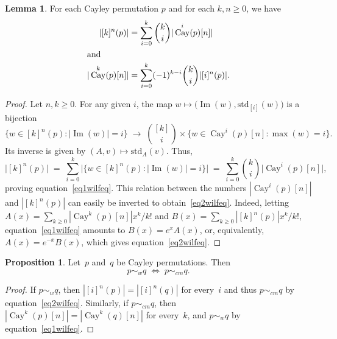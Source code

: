 \documentclass[a4paper, 11pt]{article}
\DeclareMathOperator{\Cay}{Cay}
\DeclareMathOperator{\Img}{Im}
\newcommand{\std}{\mathrm{std}}
\theoremstyle{definition}
\newtheorem{lemma}[theorem]{Lemma}
\newtheorem{proposition}[theorem]{Proposition}
\begin{document}
\begin{lemma}\label{lemma: eqforwilfequiv}
For each Cayley permutation $p$ and for each $k,n\ge 0$, we have
\begin{align}
|[k]^n(p)| &= \sum_{i=0}^k \binom{k}{i}|\Cay^i(p)[n]|\label{eq1wilfeq}\\
\shortintertext{and}
|\Cay^k(p)[n]| &= \sum_{i=0}^k(-1)^{k-i}\binom{k}{i}|[i]^n(p)|.\label{eq2wilfeq}
\end{align}
\end{lemma}
\begin{proof}
Let $n,k\ge 0$. For any given $i$, the map
$w\mapsto\bigl(\Img(w),\std_{[i]}(w)\bigr)$ is a bijection
\[
  \bigl\{ w\in [k]^n(p): |\Img(w)|=i \bigr\}
  \;\longrightarrow\;
  \binom{[k]}{i}\times \bigl\{w\in\Cay^i(p)[n]:\max(w)=i\bigr\}.
\]
Its inverse is given by $(A,v)\mapsto\std_A(v)$.
Thus,
\[
\bigl|[k]^n(p)\bigr|
\;=\; \sum_{i=0}^k \bigl|\bigl\{ w\in [k]^n(p): |\Img(w)|=i\bigr\}\bigr|
\;=\; \sum_{i=0}^k \binom{k}{i}\bigl|\Cay^i(p)[n]\bigr|,
\]
proving equation~\eqref{eq1wilfeq}. This relation between
the numbers $|\Cay^i(p)[n]|$ and $|[k]^n(p)|$ can easily be
inverted to obtain~\eqref{eq2wilfeq}. Indeed, letting
$A(x)=\sum_{k\ge 0}|\Cay^k(p)[n]|x^k/k!$ and
$B(x)=\sum_{k\ge 0}|[k]^n(p)|x^k/k!$, equation~\eqref{eq1wilfeq}
amounts to $B(x) = e^xA(x)$, or, equivalently, $A(x)=e^{-x}B(x)$, which gives
equation~\eqref{eq2wilfeq}.
\end{proof}

\begin{proposition}\label{prop: caywilfeq}
Let~$p$ and~$q$ be Cayley permutations. Then
$$
p\sim_w q\;\iff\;p\sim_{cm}q.
$$
\end{proposition}
\begin{proof}
If $p\sim_w q$, then $|[i]^n(p)|=|[i]^n(q)|$ for every~$i$
and thus $p\sim_{cm} q$ by equation~\eqref{eq2wilfeq}.
Similarly, if $p\sim_{cm} q$, then $|\Cay^k(p)[n]|=|\Cay^k(q)[n]|$
for every~$k$, and $p\sim_{w} q$ by equation~\eqref{eq1wilfeq}.
\end{proof}
\end{document}
